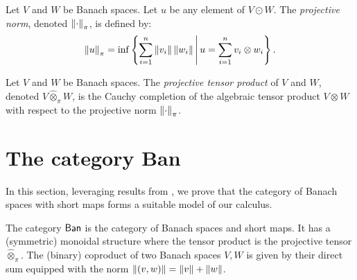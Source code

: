 \begin{definition} \cite[Chapter 2.1]{ryanIntroductionTensorProducts2013}
  Let $V$ and $W$ be Banach spaces. Let $u$ be any element of $V \odot W$. The \emph{projective norm}, denoted $\left\lVert  \cdot  \right\rVert_{\pi}$,  is defined by: 
  \[
 \left\lVert u \right\rVert_{\pi} = \inf\left\{ \sum_{i=1}^n \left\lVert v_i \right\rVert \left\lVert w_i \right\rVert \Bigg| \, u = \sum_{i=1}^n v_i \otimes w_i\right\}.
\]
\end{definition}


\begin{definition} \cite[Chapter 2.1]{ryanIntroductionTensorProducts2013}
  Let \( V \) and \( W \) be Banach spaces. The \emph{projective tensor product} of \( V \) and \( W \), denoted  $ V \widehat{\otimes}_\pi W$, is the Cauchy  completion of the algebraic tensor product \( V \otimes W \) with respect to the projective norm \( \left\lVert \cdot \right\rVert_{\pi} \).
\end{definition}







\section{The category Ban}

In this section, leveraging results from \cite{dahlqvist2023syntactic}, we prove that the category of Banach spaces with short maps forms a suitable model of our calculus.

\begin{comment}
\begin{definition}
Let \( x = (x_1, x_2, \dots, x_n) \in \mathbb{C}^n \). The \( L^1 \) norm, \gls{l1_norm},  is defined by
\[
\|x\|_{L^1} = \sum_{i=1}^n |x_i|.
\]
\end{definition}
\end{comment}

\begin{definition}
  The category $\mathsf{Ban}$ is the category of Banach spaces and short maps. It has a (symmetric) monoidal structure  where the tensor product is the projective tensor $\widehat{\otimes}_\pi$.
  The (binary) coproduct of two Banach spaces $V,W$ is given by their direct sum equipped with the norm $\left\lVert (v,w) \right\rVert = \left\lVert v \right\rVert + \left\lVert w \right\rVert$.  
\end{definition}


